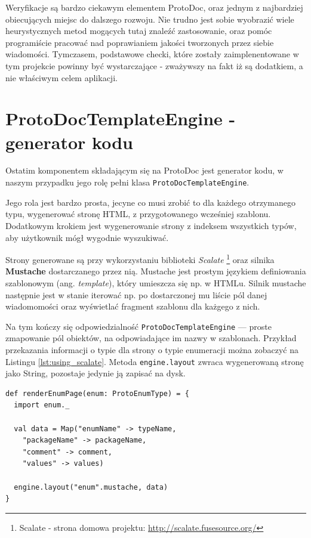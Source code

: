 \documentclass[pdflatex,11pt]{aghdpl}
\begin{document}
Weryfikacje są bardzo ciekawym elementem ProtoDoc, oraz jednym z najbardziej obiecujących miejsc do dalszego rozwoju.
Nie trudno jest sobie wyobrazić wiele heurystycznych metod mogących tutaj znaleźć zastosowanie, oraz pomóc programiście
pracować nad poprawianiem jakości tworzonych przez siebie wiadomości. Tymczasem, podstawowe checki, które zostały
zaimplenentowane w tym projekcie powinny być wystarczające - zważywszy na fakt iż są dodatkiem, a nie właściwym celem aplikacji.

\section{ProtoDocTemplateEngine - generator kodu}
Ostatim komponentem składającym się na ProtoDoc jest generator kodu, w naszym przypadku jego rolę pełni klasa \verb|ProtoDocTemplateEngine|.

Jego rola jest bardzo prosta, jecyne co musi zrobić to dla każdego otrzymanego typu, wygenerować stronę HTML, z przygotowanego wcześniej szablonu.
Dodatkowym krokiem jest wygenerowanie strony z indeksem wszystkich typów, aby użytkownik mógł wygodnie wyszukiwać.

Strony generowane są przy wykorzystaniu biblioteki \textit{Scalate} \footnote{Scalate - strona domowa projektu: \href{http://scalate.fusesource.org/}{http://scalate.fusesource.org/}}
oraz silnika \textbf{Mustache} dostarczanego przez nią. Mustache jest prostym językiem definiowania szablonowym (ang. \textit{template}), który umieszcza 
się np. w HTMLu. Silnik mustache następnie jest w stanie iterować np. po dostarczonej mu liście pól danej wiadomomości oraz wyświetlać fragment szablonu dla każgego z nich.

Na tym kończy się odpowiedzialność \verb|ProtoDocTemplateEngine| --- proste zmapowanie pól obiektów, na odpowiadające im nazwy w szablonach.
Przykład przekazania informacji o typie dla strony o typie enumeracji można zobaczyć na Listingu \ref{lst:using_scalate}. Metoda \verb|engine.layout|
zwraca wygenerowaną stronę jako String, pozostaje jedynie ją zapisać na dysk.

\newpage
\begin{lstlisting}[caption={Przykład zastosowania Scalate (z silnikiem renderowania szablonów Mustache)}label={lst:using_scalate}]
def renderEnumPage(enum: ProtoEnumType) = {
  import enum._

  val data = Map("enumName" -> typeName,
    "packageName" -> packageName,
    "comment" -> comment,
    "values" -> values)

  engine.layout("enum".mustache, data)
}
\end{lstlisting}
\end{document}
